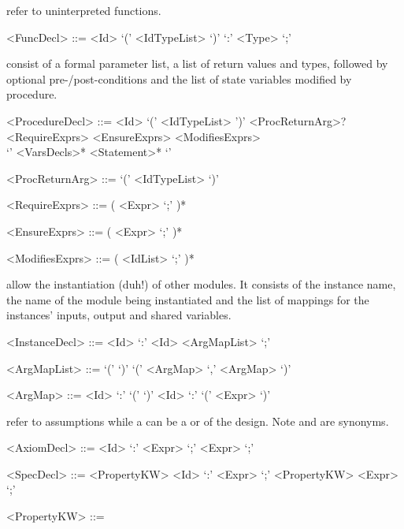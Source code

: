  refer to uninterpreted functions. 
\begin{grammar}
     <FuncDecl> ::= 
        <Id> `(' <IdTypeList> `)' `:' <Type> `;'

\end{grammar}

 consist of a formal parameter list, a list of return values and types, 
followed by optional pre-/post-conditions and the list of state variables modified by procedure.
\begin{grammar}
     <ProcedureDecl> ::=
        <Id> `(' <IdTypeList> ')' <ProcReturnArg>? \\
       <RequireExprs> <EnsureExprs> <ModifiesExprs> \\
       `{' <VarsDecls>* <Statement>* `}'

     <ProcReturnArg> ::=  `(' <IdTypeList> `)'

     <RequireExprs> ::= (  <Expr> `;' )*

     <EnsureExprs> ::= (  <Expr> `;' )*

     <ModifiesExprs> ::= (  <IdList> `;' )*

\end{grammar}

 allow the instantiation (duh!) of other modules. It consists of the instance name, the name of the module being instantiated and the list of mappings for the instances' inputs, output and shared variables. 
\begin{grammar}
     <InstanceDecl> ::=  <Id> `:' <Id> <ArgMapList> `;'

     <ArgMapList>   ::= `(' `)' 
                    \alt `(' <ArgMap> `,' <ArgMap> `)'

     <ArgMap> ::= <Id> `:' `(' `)' 
              \alt <Id> `:' `(' <Expr> `)'
             
\end{grammar}

 refer to assumptions while a  can be a  or  of the design. Note  and  are synonyms.

\begin{grammar}
     <AxiomDecl> ::=  <Id> `:' <Expr> `;'
                 \alt {} <Expr> `;'

     <SpecDecl> ::= <PropertyKW> <Id> `:' <Expr> `;'
                 \alt <PropertyKW> <Expr> `;'

     <PropertyKW> ::=  \alt {}
\end{grammar}

